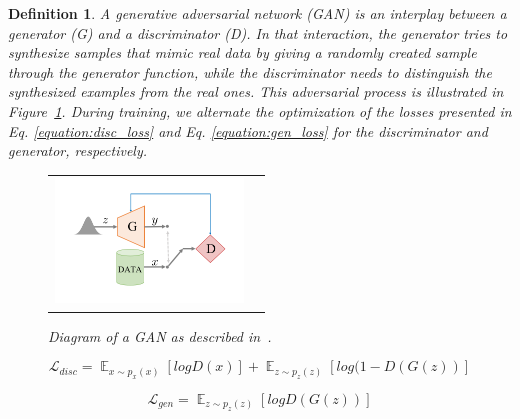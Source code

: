 \documentclass[12pt]{article}
\newtheorem{definition}{Definition}
\begin{document}
    \begin{definition}
        \normalfont
        A \emph{generative adversarial network} (GAN) \cite{NIPS2014_5ca3e9b1} is an interplay between a \emph{generator} (G) and a \emph{discriminator} (D).
        In that interaction, the generator tries to synthesize samples that mimic real data by giving a randomly created sample through the generator function, while the discriminator needs to distinguish the synthesized examples from the real ones. This adversarial process is illustrated in Figure~\ref{figure:diagram_of_gan}. During training, we alternate the optimization of the losses presented in Eq. \ref{equation:disc_loss} and Eq. \ref{equation:gen_loss} for the discriminator and generator, respectively.

        \begin{figure}[H]
            \centering
            \begin{tabular}{cc}
                \includegraphics[width = 50mm]{gan}
            \end{tabular}
            \caption{Diagram of a GAN as described in~\cite{pmlr-v80-achlioptas18a}.}
            \label{figure:diagram_of_gan}
        \end{figure}

        \begin{equation}
            \mathcal{L}_{disc} = \mathop{\mathbb{E}}_{x \sim p_x(x)}[log D(x)] + \mathop{\mathbb{E}}_{z \sim p_z(z)}[log (1 - D(G(z))]
            \label{equation:disc_loss}
        \end{equation}

        \begin{equation}
            \mathcal{L}_{gen} = \mathop{\mathbb{E}}_{z \sim p_z(z)}[log D(G(z))]
            \label{equation:gen_loss}
        \end{equation}

    \end{definition}
\end{document}
